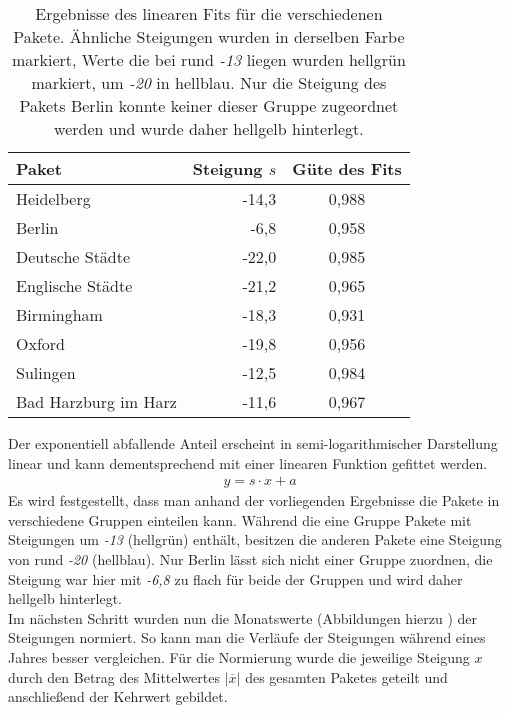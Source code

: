 \documentclass[fontsize=11pt, twoside, a4paper]{scrartcl}
\begin{document}
\begin{table}[H]
	\centering
\caption{Ergebnisse des linearen Fits für die verschiedenen Pakete. Ähnliche Steigungen wurden in derselben Farbe markiert, Werte die bei rund \textit{-13} liegen wurden hellgrün markiert, um \textit{-20} in hellblau. Nur die Steigung des Pakets Berlin konnte keiner dieser Gruppe zugeordnet werden und wurde daher hellgelb hinterlegt.}
	    \vspace{2mm}
    \begin{tabular}{|l|r|c|}
	\hline
	Paket & Steigung $s$ & Güte des Fits \\
	\hline
	Heidelberg & \cellcolor{hellgruen}-14,3 & 0,988 \\
	Berlin & \cellcolor{hellgelb}-6,8 & 0,958 \\
	Deutsche Städte & \cellcolor{hellblau}-22,0 & 0,985 \\
	Englische Städte & \cellcolor{hellblau}-21,2 & 0,965 \\
	Birmingham & \cellcolor{hellblau}-18,3 & 0,931 \\
	Oxford & \cellcolor{hellblau}-19,8 & 0,956 \\ 
	Sulingen &  \cellcolor{hellgruen}-12,5 & 0,984 \\
	Bad Harzburg im Harz &  \cellcolor{hellgruen}-11,6 & 0,967 \\
	\hline
    \end{tabular}
\end{table}
Der exponentiell abfallende Anteil erscheint in semi-logarithmischer Darstellung linear und kann dementsprechend mit einer linearen Funktion gefittet werden.
\begin{align}
y = s \cdot x + a 
\end{align} 
Es wird festgestellt, dass man anhand der vorliegenden Ergebnisse die Pakete in verschiedene Gruppen einteilen kann. Während die eine Gruppe Pakete mit Steigungen um \textit{-13} (hellgrün) enthält, besitzen die anderen Pakete eine Steigung von rund \textit{-20} (hellblau). Nur Berlin lässt sich nicht einer Gruppe zuordnen, die Steigung war hier mit \textit{-6,8} zu flach für beide der Gruppen und wird daher hellgelb hinterlegt.\\[\baselineskip]
Im nächsten Schritt wurden nun die Monatswerte (Abbildungen hierzu ) der Steigungen normiert. So kann man die Verläufe der Steigungen während eines Jahres besser vergleichen. Für die Normierung wurde die jeweilige Steigung $x$ durch den Betrag des Mittelwertes $\vert \overline{x} \vert$ des gesamten Paketes geteilt und anschließend der Kehrwert gebildet.
\end{document}
